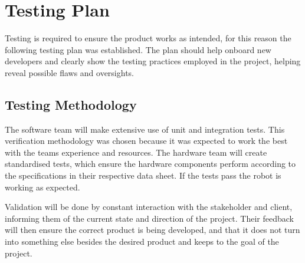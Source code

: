 \newpage
\section{Testing Plan}
\label{section:testing_plan}

Testing is required to ensure the product works as intended, for this reason the following testing plan was established. The plan should help onboard new developers and clearly show the testing practices employed in the project, helping reveal possible flaws and oversights.


\begin{comment}
\helper{General example}
This Testing Plan provides a detailed outline of the testing strategy, approach, and procedures we employ in our project. It establishes a clear pathway for validating and verifying our project's software and hardware components, ensuring they meet the specified requirements. The plan is designed to offer clarity for any team members joining at any project lifecycle stage. Understanding this plan will provide a solid understanding of our testing practices and expectations, aligning with our overall project goals.
\end{comment}

\subsection{Testing Methodology}

The software team will make extensive use of unit and integration tests. This verification methodology was chosen because it was expected to work the best with the teams experience and resources.
The hardware team will create standardised tests, which ensure the hardware components perform according to the specifications in their respective data sheet. If the tests pass the robot is working as expected.

Validation will be done by constant interaction with the stakeholder and client, informing them of the current state and direction of the project. Their feedback will then ensure the correct product is being developed, and that it does not turn into something else besides the desired product and keeps to the goal of the project.

